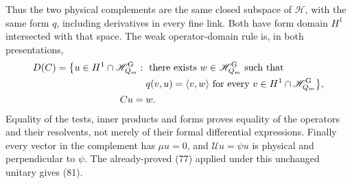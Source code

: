 \documentclass[11pt]{article}
\newcommand{\HH}{\mathscr H}
\begin{document}
Thus the two physical complements are the same closed subspace
of $\HH$, with the same form $q$, including derivatives in every
fine link. Both have form domain $H^1$ intersected with that space.
The weak operator-domain rule is, in both presentations,
\[
\begin{aligned}
 D(C)=\bigl\{u\in H^1\cap\HH_{Q_m}^{\rm G}:{}&
 \text{ there exists }w\in\HH_{Q_m}^{\rm G}\text{ such that}\\
 &q(v,u)=\langle v,w\rangle
 \text{ for every }v\in H^1\cap\HH_{Q_m}^{\rm G}\bigr\},\\
 Cu={}&w.
\end{aligned}
\]
Equality of the tests, inner products and forms proves equality
of the operators and their resolvents, not merely of their formal
differential expressions. Finally every vector in the complement
has $\mu u=0$, and $\mathcal Uu=\psi u$ is physical and perpendicular
to $\psi$. The already-proved (77) applied under
this unchanged unitary gives (81).
\end{document}
